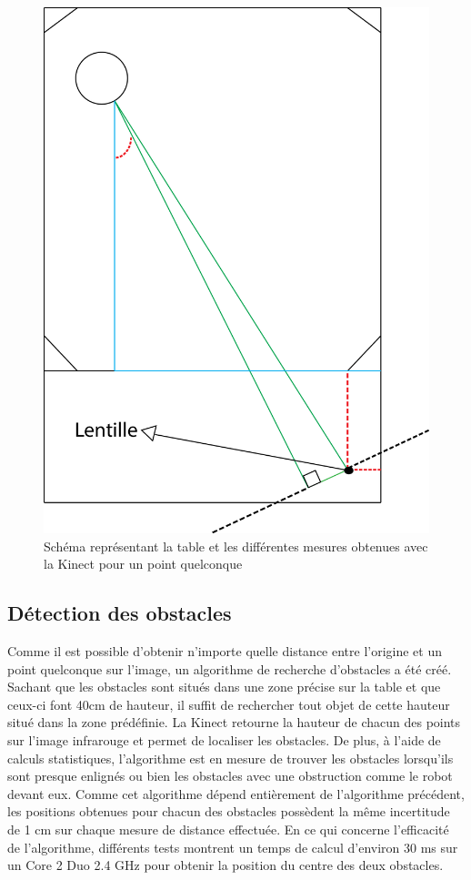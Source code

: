 \begin{figure}[htbp]
\centering
\includegraphics[scale=0.5]{fig/kinect_distance.png}
\caption{Schéma représentant la table et les différentes mesures obtenues avec la Kinect pour un point quelconque}
\label{fig:kinect_distance}
\end{figure}

\subsection{Détection des obstacles}
Comme il est possible d'obtenir n'importe quelle distance entre l'origine et un point quelconque sur l'image, un algorithme de recherche d'obstacles a été créé. Sachant que les obstacles sont situés dans une zone précise sur la table et que ceux-ci font 40cm de hauteur, il suffit de rechercher tout objet de cette hauteur situé dans la zone prédéfinie. La Kinect retourne la hauteur de chacun des points sur l'image infrarouge et permet de localiser les obstacles. De plus, à l'aide de calculs statistiques, l'algorithme est en mesure de trouver les obstacles lorsqu'ils sont presque enlignés ou bien les obstacles avec une obstruction comme le robot devant eux. Comme cet algorithme dépend entièrement de l'algorithme précédent, les positions obtenues pour chacun des obstacles possèdent la même incertitude de 1 cm sur chaque mesure de distance effectuée. En ce qui concerne l'efficacité de l'algorithme, différents tests montrent un temps de calcul d'environ 30 ms sur un Core 2 Duo 2.4 GHz pour obtenir la position du centre des deux obstacles.

